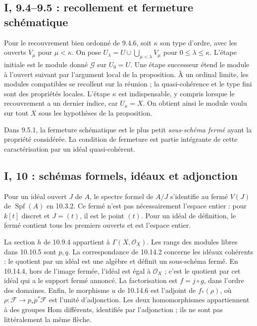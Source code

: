 \documentclass[11pt,a4paper]{article}
\begin{document}
\subsection{I, 9.4--9.5 : recollement et fermeture schématique}
\label{note:base1-transfinite}
Pour le recouvrement bien ordonné de 9.4.6, soit $\kappa$ son type
d'ordre, avec les ouverts $V_\mu$ pour $\mu<\kappa$.
On pose $U_\lambda=U\cup\bigcup_{\mu<\lambda}V_\mu$ pour
$0\leq\lambda\leq\kappa$. L'étape initiale est le module donné
$\mathcal G$ sur $U_0=U$. Une étape successeur étend le module
à l'ouvert suivant par l'argument local de la proposition.
À un ordinal limite, les modules compatibles se recollent sur
la réunion ; la quasi-cohérence et le type fini sont des propriétés
locales. L'étape $\kappa$ est indispensable, y compris lorsque le
recouvrement a un dernier indice, car $U_\kappa=X$.
On obtient ainsi le module voulu sur tout $X$ sous les hypothèses
de la proposition.

Dans 9.5.1, la fermeture schématique est le plus petit
\emph{sous-schéma fermé} ayant la propriété considérée.
La condition de fermeture est partie intégrante de cette
caractérisation par un idéal quasi-cohérent.

\subsection{I, 10 : schémas formels, idéaux et adjonction}
\label{note:base1-formal}
Pour un idéal ouvert $J$ de $A$, le spectre formel de $A/J$ s'identifie
au fermé $V(J)$ de $\operatorname{Spf}(A)$ en 10.3.2.
Ce fermé n'est pas nécessairement l'espace entier : pour $k[t]$ discret
et $J=(t)$, il est le point $(t)$. Pour un idéal de définition,
le fermé contient tous les premiers ouverts et est l'espace entier.

La section $h$ de 10.9.4 appartient à $\Gamma(X,\mathcal O_X)$.
Les rangs des modules libres dans 10.10.5 sont $p,q$.
La correspondance de 10.14.2 concerne les idéaux cohérents : le
quotient par un idéal est une algèbre et définit un sous-schéma fermé.
En 10.14.4, hors de l'image fermée, l'idéal est égal à $\mathcal O_X$ ;
c'est le quotient par cet idéal qui a le support fermé annoncé.
La factorisation est $f=j\circ g$, dans l'ordre des domaines.
Enfin, le morphisme $u$ de 10.14.6 est l'adjoint de $f_*(\rho)$,
où $\rho:\mathcal F\to p_*p^*\mathcal F$ est l'unité d'adjonction.
Les deux homomorphismes appartiennent à des groupes Hom différents,
identifiés par l'adjonction ; ils ne sont pas littéralement la même flèche.
\end{document}
